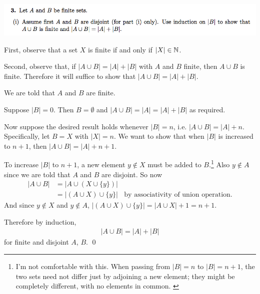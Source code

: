 \documentclass[12pt]{article}
\begin{document}
\subsection*{} %
\includegraphics[width=400pt]{img/iulm-1-3.png}
\begin{mdframed}
First, observe that a set $X$ is finite if and only if $|X| \in \mathbb{N}$.

Second, observe that, if $|A \cup B| = |A| + |B|$ with $A$ and $B$ finite, then
$A \cup B$ is finite. Therefore it will suffice to show that
$|A \cup B| = |A| + |B|$.

We are told that $A$ and $B$ are finite.

Suppose $|B| = 0$. Then $B = \emptyset$ and $|A \cup B| = |A| = |A| + |B|$ as required.

Now suppose the desired result holds whenever $|B| = n$, i.e.
$|A \cup B| = |A| + n$. Specifically, let $B = X$ with $|X| = n$. We want to
show that when $|B|$ is increased to $n+1$, then $|A \cup B| = |A| + n+1$.

To increase $|B|$ to $n+1$, a new element $y \notin X$ must be added to
$B$.\footnote{I'm not comfortable with this. When passing from $|B| = n$ to
  $|B| = n+1$, the two sets need not differ just by adjoining a new element;
  they might be completely different, with no elements in
  common. \label{cardinality-induction-discomfort}} Also $y \notin A$ since we
are told that $A$ and $B$ are disjoint. So now
\begin{align*}
  |A \cup B| &= |A \cup (X \cup \{y\})|\\
             &= |(A \cup X) \cup \{y\}| ~~~~\text{by associativity of union operation.}
\end{align*}
And since $y \notin X$ and $y \notin A$, $|(A \cup X) \cup \{y\}| = |A \cup X| + 1 = n + 1$.

Therefore by induction,
\begin{align*}
  |A \cup B| = |A| + |B|
\end{align*}
for finite and disjoint $A$, $B$. \qed
\end{mdframed}
\end{document}
